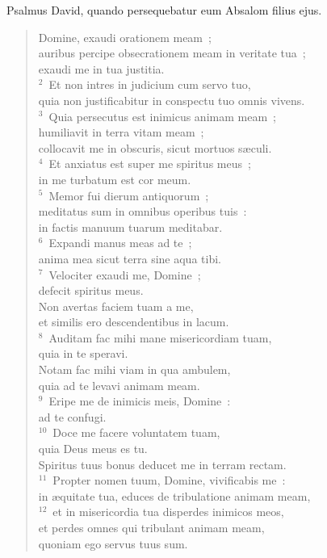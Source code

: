 \bchapter
\lettrine[lines=3,image=true,loversize=0.05,lraise=-0.03]{P}{}salmus David, quando persequebatur eum Absalom filius ejus. \begin{flushleft}\begin{verse}\vspace{6pt}Domine, exaudi orationem meam~;\\ auribus percipe obsecrationem meam in veritate tua~;\\ exaudi me in tua justitia.\\
${}^{2}$~Et non intres in judicium cum servo tuo,\\ quia non justificabitur in conspectu tuo omnis vivens.\\
${}^{3}$~Quia persecutus est inimicus animam meam~;\\ humiliavit in terra vitam meam~;\\ collocavit me in obscuris, sicut mortuos s\ae culi.\\
${}^{4}$~Et anxiatus est super me spiritus meus~;\\ in me turbatum est cor meum.\\
${}^{5}$~Memor fui dierum antiquorum~;\\ meditatus sum in omnibus operibus tuis~:\\ in factis manuum tuarum meditabar.\\
${}^{6}$~Expandi manus meas ad te~;\\ anima mea sicut terra sine aqua tibi.\\
${}^{7}$~Velociter exaudi me, Domine~;\\ defecit spiritus meus.\\ Non avertas faciem tuam a me,\\ et similis ero descendentibus in lacum.\\
${}^{8}$~Auditam fac mihi mane misericordiam tuam,\\ quia in te speravi.\\ Notam fac mihi viam in qua ambulem,\\ quia ad te levavi animam meam.\\
${}^{9}$~Eripe me de inimicis meis, Domine~:\\ ad te confugi.\\
${}^{10}$~Doce me facere voluntatem tuam,\\ quia Deus meus es tu.\\ Spiritus tuus bonus deducet me in terram rectam.\\
${}^{11}$~Propter nomen tuum, Domine, vivificabis me~:\\ in \ae quitate tua, educes de tribulatione animam meam,\\
${}^{12}$~et in misericordia tua disperdes inimicos meos,\\ et perdes omnes qui tribulant animam meam,\\ quoniam ego servus tuus sum.\end{verse}\end{flushleft}



